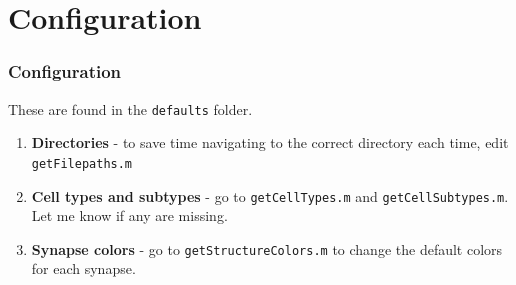 \documentclass[11pt]{beamer}
\begin{document}
\section{Configuration}
\begin{frame}
	\frametitle{Configuration}
		These are found in the \texttt{defaults} folder.
		\begin{enumerate}
			\item \textbf{Directories} - to save time navigating to the correct directory each time, edit \texttt{getFilepaths.m}
			\item \textbf{Cell types and subtypes} - go to \texttt{getCellTypes.m} and \texttt{getCellSubtypes.m}. Let me know if any are missing.
			\item \textbf{Synapse colors} - go to \texttt{getStructureColors.m} to change the default colors for each synapse. 
		\end{enumerate}
\end{frame}

\end{document}
